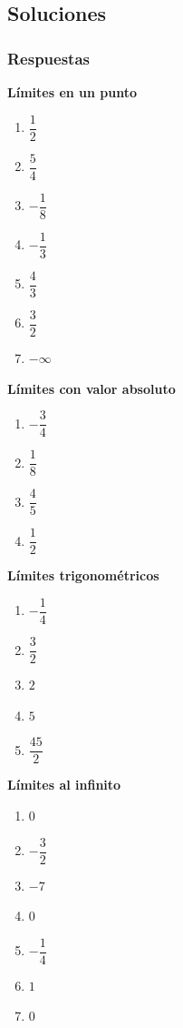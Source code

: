 \documentclass[12pt]{article}
\begin{document}
\subsection{Soluciones}

\subsubsection{Respuestas}


\textbf{Límites en un punto}
\begin{enumerate}
    \item $\dfrac{1}{2}$
    \item $\dfrac{5}{4}$
    \item $-\dfrac{1}{8}$
    \item $-\dfrac{1}{3}$
    \item $\dfrac{4}{3}$
    \item $\dfrac{3}{2}$
    \item $-\infty$
\end{enumerate}

\textbf{Límites con valor absoluto}
\begin{enumerate}
    \item $-\dfrac{3}{4}$
    \item $\dfrac{1}{8}$
    \item $\dfrac{4}{5}$
    \item $\dfrac{1}{2}$
\end{enumerate}

\textbf{Límites trigonométricos}
\begin{enumerate}
    \item $-\dfrac{1}{4}$
    \item $\dfrac{3}{2}$
    \item $2$
    \item $5$
    \item $\dfrac{45}{2}$
\end{enumerate}

\textbf{Límites al infinito}
\begin{enumerate}
    \item $0$
    \item $-\dfrac{3}{2}$
    \item $-7$
    \item $0$
    \item $-\dfrac{1}{4}$
    \item $1$
    \item $0$
\end{enumerate}
\end{document}
